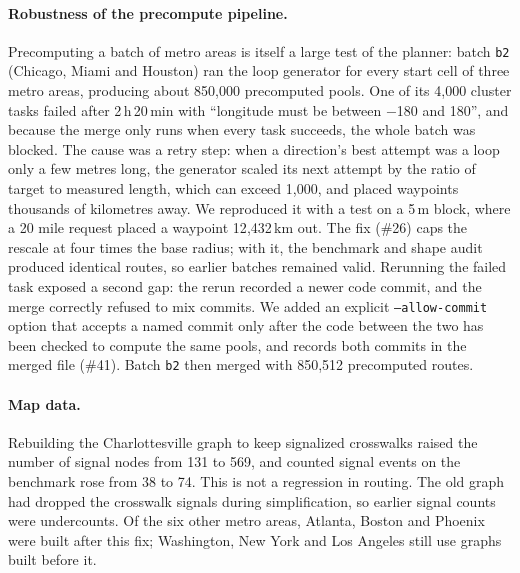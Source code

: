 \paragraph{Robustness of the precompute pipeline.}
Precomputing a batch of metro areas is itself a large test of the planner:
batch \texttt{b2} (Chicago, Miami and Houston) ran the loop generator for
every start cell of three metro areas, producing about 850{,}000 precomputed
pools. One of its 4{,}000 cluster tasks failed after
2\,h\,20\,min with ``longitude must be between $-$180 and 180'', and because the
merge only runs when every task succeeds, the whole batch was blocked. The
cause was a retry step: when a direction's best attempt was a loop only a few
metres long, the generator scaled its next attempt by the ratio of target to
measured length, which can exceed 1{,}000, and placed waypoints thousands of
kilometres away. We reproduced it with a test on a 5\,m block, where a
20 mile request placed a waypoint 12{,}432\,km out. The fix (\#26) caps the
rescale at four times the base radius; with it, the benchmark and shape audit
produced identical routes, so earlier batches remained valid. Rerunning the
failed task exposed a second gap: the rerun recorded a newer code commit, and
the merge correctly refused to mix commits. We added an explicit
\texttt{--allow-commit} option that accepts a named commit only after the
code between the two has been checked to compute the same pools, and records
both commits in the merged file (\#41). Batch \texttt{b2} then merged with
850{,}512 precomputed routes.

\paragraph{Map data.}
Rebuilding the Charlottesville graph to keep signalized crosswalks raised the
number of signal nodes from 131 to 569, and counted signal events on the
benchmark rose from 38 to 74. This is not a regression in routing. The old
graph had dropped the crosswalk signals during simplification, so earlier
signal counts were undercounts. Of the six other metro areas, Atlanta, Boston
and Phoenix were built after this fix; Washington, New York and Los Angeles
still use graphs built before it.
